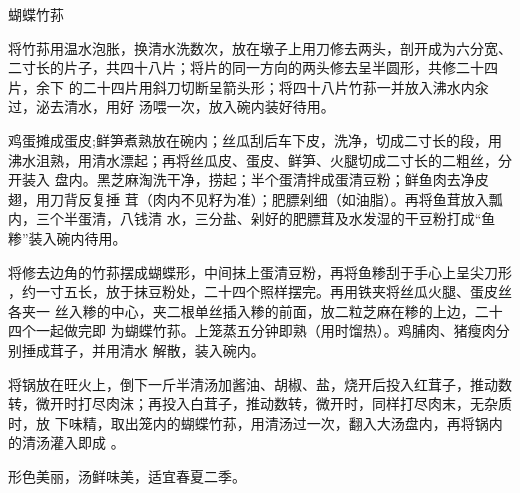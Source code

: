 \begin{recipe}{蝴蝶竹荪}

\ingredients


\preparation

\step 将竹荪用温水泡胀，换清水洗数次，放在墩子上用刀修去两头，剖开成为六分宽、
二寸长的片子，共四十八片；将片的同一方向的两头修去呈半圆形，共修二十四片，余下
的二十四片用斜刀切断呈箭头形；将四十八片竹荪一并放入沸水内汆过，泌去清水，用好
汤喂一次，放入碗内装好待用。

\step 鸡蛋摊成蛋皮;鲜笋煮熟放在碗内；丝瓜刮后车下皮，洗净，切成二寸长的段，用
沸水沮熟，用清水漂起；再将丝瓜皮、蛋皮、鲜笋、火腿切成二寸长的二粗丝，分开装入
盘内。黑芝麻淘洗干净，捞起；半个蛋清拌成蛋清豆粉；鲜鱼肉去净皮翅，用刀背反复捶
茸（肉内不见籽为准）；肥膘剁细（如油脂）。再将鱼茸放入瓢内，三个半蛋清，八钱清
水，三分盐、剁好的肥膘茸及水发湿的干豆粉打成“鱼糁”装入碗内待用。

\step 将修去边角的竹荪摆成蝴蝶形，中间抹上蛋清豆粉，再将鱼糁刮于手心上呈尖刀形
，约一寸五长，放于抹豆粉处，二十四个照样摆完。再用铁夹将丝瓜火腿、蛋皮丝各夹一
丝入糁的中心，夹二根单丝插入糁的前面，放二粒芝麻在糁的上边，二十四个一起做完即
为蝴蝶竹荪。上笼蒸五分钟即熟（用时馏热）。鸡脯肉、猪瘦肉分别捶成茸子，并用清水
解散，装入碗内。

\step 将锅放在旺火上，倒下一斤半清汤加酱油、胡椒、盐，烧开后投入红茸子，推动数
转，微开时打尽肉沫；再投入白茸子，推动数转，微开时，同样打尽肉末，无杂质时，放
下味精，取出笼内的蝴蝶竹荪，用清汤过一次，翻入大汤盘内，再将锅内的清汤灌入即成
。

\features

形色美丽，汤鲜味美，适宜春夏二季。

\end{recipe}

